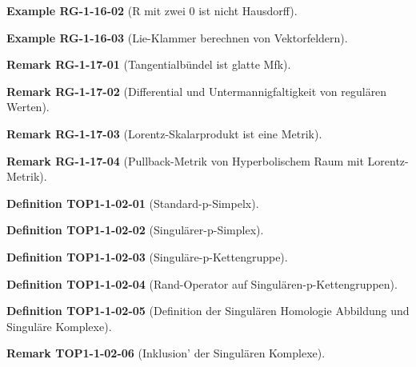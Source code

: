 \documentclass[10pt, letterpaper]{article}
\newcommand{\CustomHeading}[3]{%
  \par\medskip\noindent%
  \textbf{#1 #2} \textnormal{(#3)}.\enskip%
}
\newenvironment{DEF}[2]{\CustomHeading{Definition}{#1}{#2}}{}
\newenvironment{REM}[2]{\CustomHeading{Remark}{#1}{#2}}{}
\newenvironment{EXA}[2]{\CustomHeading{Example}{#1}{#2}}{}
\begin{document}
\begin{EXA}{RG-1-16-02}{R mit zwei $0$ ist nicht Hausdorff}
\end{EXA}

\begin{EXA}{RG-1-16-03}{Lie-Klammer berechnen von Vektorfeldern}
\end{EXA}

\begin{REM}{RG-1-17-01}{Tangentialbündel ist glatte Mfk}
\end{REM}

\begin{REM}{RG-1-17-02}{Differential und Untermannigfaltigkeit von regulären Werten}
\end{REM}

\begin{REM}{RG-1-17-03}{Lorentz-Skalarprodukt ist eine Metrik}
\end{REM}

\begin{REM}{RG-1-17-04}{Pullback-Metrik von Hyperbolischem Raum mit Lorentz-Metrik}
\end{REM}

\begin{DEF}{TOP1-1-02-01}{Standard-p-Simpelx}
\end{DEF}

\begin{DEF}{TOP1-1-02-02}{Singulärer-p-Simplex}
\end{DEF}

\begin{DEF}{TOP1-1-02-03}{Singuläre-p-Kettengruppe}
\end{DEF}

\begin{DEF}{TOP1-1-02-04}{Rand-Operator auf Singulären-p-Kettengruppen}
\end{DEF}

\begin{DEF}{TOP1-1-02-05}{Definition der Singulären Homologie Abbildung und Singuläre Komplexe}
\end{DEF}

\begin{REM}{TOP1-1-02-06}{Inklusion' der Singulären Komplexe}
\end{REM}
\end{document}
